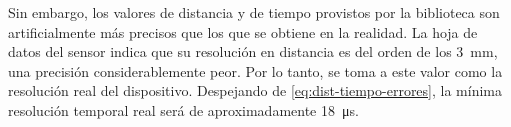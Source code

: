 Sin embargo, los valores de distancia y de tiempo provistos por la biblioteca son artificialmente más precisos que los que se obtiene en la realidad. La hoja de datos del sensor indica que su resolución en distancia es del orden de los \qty{3}{\mm}, una precisión considerablemente peor. Por lo tanto, se toma a este valor como la resolución real del dispositivo. Despejando de \eqref{eq:dist-tiempo-errores}, la mínima resolución temporal real será de aproximadamente \qty{18}{\us}.


